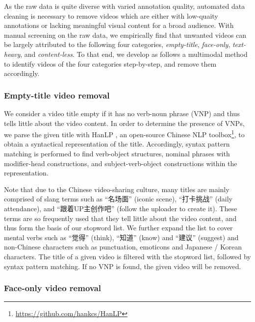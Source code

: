  
As the raw data is quite diverse with varied annotation quality, automated data cleaning is necessary to remove videos which are either with low-quaity annotations or lacking meaningful visual content for a broad audience. With manual screening on the raw data, we empirically find that unwanted videos can be largely attributed to the following four categories, \ie \emph{empty-title}, \emph{face-only}, \textit{text-heavy}, and \emph{content-less}. To that end, we develop as follows a multimodal method to identify videos of the four categories step-by-step, and remove them accordingly. 


\subsubsection{Empty-title video removal}

We consider a video title empty if it has no verb-noun phrase (VNP) and thus tells little about the video content. In order to determine the presence of VNPs, we parse the given title with HanLP \cite{hanlp}, an open-source Chinese NLP toolbox\footnote{\url{https://github.com/hankcs/HanLP}}, to obtain a syntactical representation of the title. Accordingly, syntax pattern matching is performed to find verb-object structures, nominal phrases with modifier-head constructions, and subject-verb-object constructions within the representation. 

\begin{CJK*}{UTF8}{gbsn}
Note that due to the Chinese video-sharing culture, many titles are mainly  comprised of slang terms such as ``名场面'' (iconic scene), ``打卡挑战'' (daily attendance), and ``跟着UP主创作吧'' (follow the uploader to create it). These terms are so frequently used that they tell little about the video content, and thus form the basis of our stopword list. We further expand the list to cover mental verbs such as ``觉得'' (think), ``知道'' (know) and ``建议'' (suggest) and non-Chinese characters such as punctuation, emoticons and Japanese / Korean characters. The title of a given video is filtered with the stopword list, followed by syntax pattern matching. If no VNP is found, the given video will be removed.
\end{CJK*}

\subsubsection{Face-only video removal}

